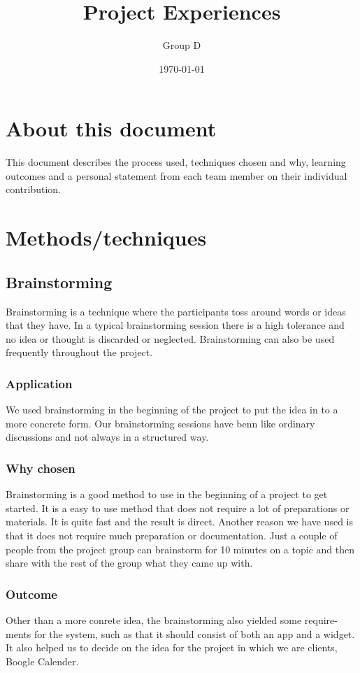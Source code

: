 \documentclass[a4paper]{article}
\title{Project Experiences}
\author{Group D}
\date{\today}
\begin{document}
	\maketitle
	\thispagestyle{empty}
	\setcounter{page}{0}
	\pagebreak
	\tableofcontents
	\pagebreak
	
  \section{About this document}
  This document describes the process used, techniques chosen and why, learning
outcomes and a personal statement from each team member on their individual
contribution.
  \section{Methods/techniques}
  \subsection{Brainstorming}
Brainstorming is a technique where the participants toss around words or ideas
that they have. In a typical brainstorming session there is a high tolerance and
no idea or thought is discarded or neglected. Brainstorming can also be used
frequently throughout the project.
    \subsubsection{Application}
We used brainstorming in the beginning of the project to put the idea in to
a more concrete form. Our brainstorming sessions have benn like ordinary
discussions and not always in a structured way.
    \subsubsection{Why chosen}
Brainstorming is a good method to use in the beginning of a project to get
started. It is a easy to use method that does not require a lot of preparations or
materials. It is quite fast and the result is direct. Another reason we have used
is that it does not require much preparation or documentation. Just a couple
of people from the project group can brainstorm for 10 minutes on a topic and
then share with the rest of the group what they came up with.

    \subsubsection{Outcome}
    Other than a more conrete idea, the brainstorming also yielded some require-
ments for the system, such as that it should consist of both an app and a widget.
It also helped us to decide on the idea for the project in which we are clients,
Boogle Calender.
\end{document}

